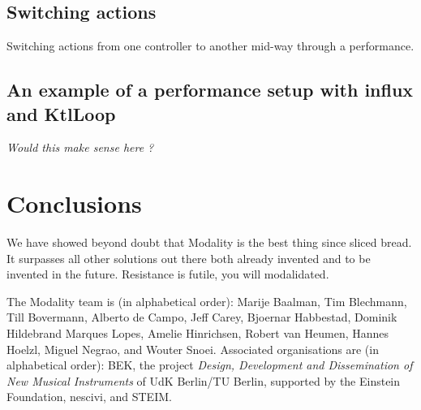 \documentclass{article}
\begin{document}
\subsection{Switching actions}
\label{sub:switching_actions}

Switching actions from one controller to another mid-way through a performance.

\subsection{An example of a performance setup with influx and KtlLoop}

\emph{Would this make sense here ?}

\section{Conclusions}
\label{sec:conclusions}

We have showed beyond doubt that Modality is the best thing since sliced bread. It surpasses all other solutions out there both already invented and to be invented in the future. Resistance is futile, you will modalidated.


\begin{acknowledgments}
The Modality team is (in alphabetical order):
    Marije Baalman,
	Tim Blechmann,
    Till Bovermann,
    Alberto de Campo,
    Jeff Carey,
    Bjoernar Habbestad,
	Dominik Hildebrand Marques Lopes,
	Amelie Hinrichsen,
    Robert van Heumen,
    Hannes Hoelzl,
    Miguel Negrao, and
    Wouter Snoei.
Associated organisations are (in alphabetical order):
BEK,
the project \emph{Design, Development and Dissemination of New Musical Instruments} of UdK Berlin/TU Berlin, supported by the Einstein Foundation,
nescivi, and
STEIM.



\end{acknowledgments} 


\end{document}
